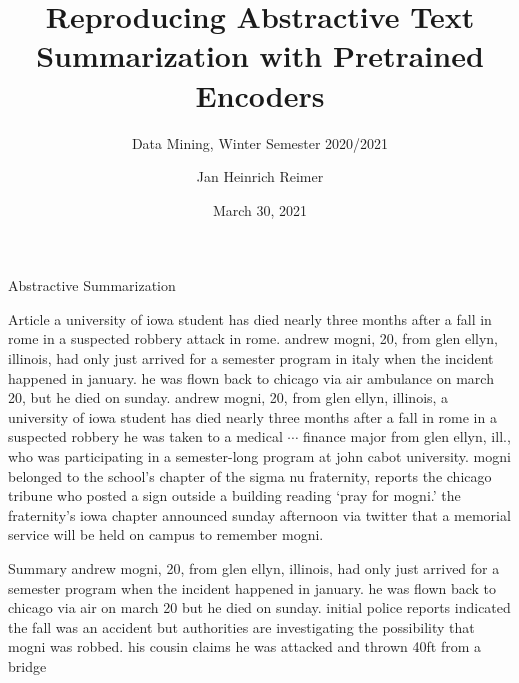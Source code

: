 \documentclass[english,handout]{mlutalk}
\title{Reproducing Abstractive Text Summarization with Pretrained Encoders}
\subtitle{Data Mining, Winter Semester 2020/2021}
\author{Jan Heinrich Reimer}
\institute{Martin Luther University Halle-Wittenberg}
\date{March 30, 2021}
\begin{document}
\titleframe

\begin{frame}{Abstractive Summarization}
    \begin{block}{Article}
        \scriptsize
        a university of iowa student has died nearly three months after a fall in rome in a suspected robbery attack in rome. andrew mogni, 20, from glen ellyn, illinois, had only just arrived for a semester program in italy when the incident happened in january. he was flown back to chicago via air ambulance on march 20, but he died on sunday. andrew mogni, 20, from glen ellyn, illinois, a university of iowa student has died nearly three months after a fall in rome in a suspected robbery he was taken to a medical 
        \quad\(\cdots\)\quad
        finance major from glen ellyn, ill., who was participating in a semester-long program at john cabot university. mogni belonged to the school's chapter of the sigma nu fraternity, reports the chicago tribune who posted a sign outside a building reading `pray for mogni.' the fraternity's iowa chapter announced sunday afternoon via twitter that a memorial service will be held on campus to remember mogni.
    \end{block}
    \begin{block}{Summary}
        \scriptsize
        andrew mogni, 20, from glen ellyn, illinois, had only just arrived for a semester program when the incident happened in january. he was flown back to chicago via air on march 20 but he died on sunday. initial police reports indicated the fall was an accident but authorities are investigating the possibility that mogni was robbed. his cousin claims he was attacked and thrown 40ft from a bridge

\end{block}
\end{frame}
\end{document}
